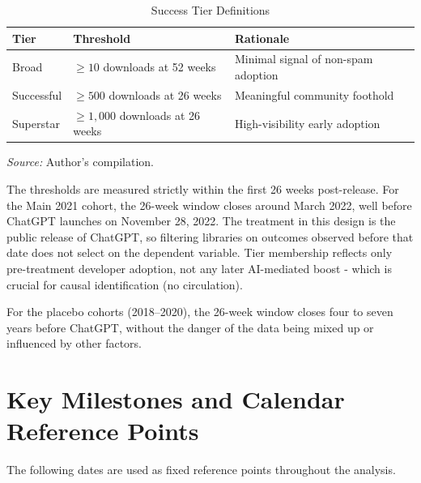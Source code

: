 \documentclass[12pt, a4paper]{report}
\begin{document}
\begin{table}[ht]
\centering
\caption{Success Tier Definitions}\label{tab:tiers}
\small
\begin{tabular}{lll}
\toprule
\textbf{Tier} & \textbf{Threshold} & \textbf{Rationale} \\ \midrule
Broad & $\ge 10$ downloads at 52 weeks & Minimal signal of non-spam adoption \\
Successful & $\ge 500$ downloads at 26 weeks & Meaningful community foothold \\
Superstar & $\ge 1{,}000$ downloads at 26 weeks & High-visibility early adoption \\ \bottomrule
\end{tabular}
\par\smallskip\noindent\textit{Source:} Author's compilation.
\end{table}

The thresholds are measured strictly within the first 26 weeks post-release. For the Main 2021 cohort, the 26-week window closes around March 2022, well before ChatGPT launches on November 28, 2022. The treatment in this design is the public release of ChatGPT, so filtering libraries on outcomes observed before that date does not select on the dependent variable. Tier membership reflects only pre-treatment developer adoption, not any later AI-mediated boost - which is crucial for causal identification (no circulation).

For the placebo cohorts (2018--2020), the 26-week window closes four to seven years before ChatGPT, without the danger of the data being mixed up or influenced by other factors.

\section{Key Milestones and Calendar Reference Points}\label{sec:data-milestones}
The following dates are used as fixed reference points throughout the analysis.
\end{document}
